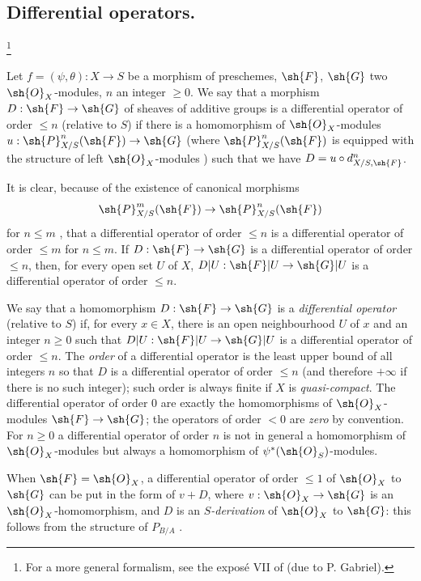 \subsection{Differential operators.}
\footnote{
  For a more general formalism, see the expos\'e VII of \cite{IV-42} (due to P. Gabriel).
}
\label{IV.16.8}

\begin{definition}[16.8.1]
\label{IV.16.8.1}
Let $f = (\psi, \theta): X \to S$ be a morphism of preschemes, $\sh{F}$, $\sh{G}$ two $\sh{O}_X$-modules, $n$ an integer $\geq 0$.
We say that a morphism $D: \sh{F} \to \sh{G}$ of sheaves of additive groups is a differential operator of order $\leq n$ (relative to $S$) if there is a homomorphism of $\sh{O}_X$-modules $u: \sh{P}_{X/S}^n(\sh{F}) \to \sh{G}$ (where $\sh{P}_{X/S}^n(\sh{F})$ is equipped with the structure of left $\sh{O}_X$-modules ) such that we have $D = u \circ d_{X/S, \sh{F}}^n$.
\end{definition}

It is clear, because of the existence of canonical morphisms
\[
  \sh{P}_{X/S}^m(\sh{F}) \to \sh{P}_{X/S}^n(\sh{F})
\] 
for $n \leq m$ , that a differential operator of order $\leq n$ is a differential operator of order $\leq m$ for $n \leq m$.
If $D:\sh{F} \to \sh{G}$ is a differential operator of order $\leq n$, then, for every open set $U$ of $X$, $D|U: \sh{F}|U \to \sh{G}|U$ is a differential operator of order $\leq n$.

We say that a homomorphism $D: \sh{F} \to \sh{G}$ is a \emph{differential operator} (relative to $S$) if, for every $x \in X$, there is an open neighbourhood $U$ of $x$ and an integer $n \geq 0$ such that $D|U: \sh{F}|U \to \sh{G}|U$ is a differential operator of order $\leq n$.
The \emph{order} of a differential operator is the least upper bound of all integers $n$ so that $D$ is a differential operator of order $\leq n$ (and therefore $+\infty$ if there is no such integer);
such order is always finite if $X$ is \emph{quasi-compact}.
The differential operator of order $0$ are exactly the homomorphisms of $\sh{O}_X$-modules $\sh{F} \to \sh{G}$;
the operators of order $<0$ are \emph{zero} by convention.
For $n \geq 0$ a differential operator of order $n$ is not in general a homomorphism of $\sh{O}_X$-modules but always a homomorphism of $\psi^*(\sh{O}_S)$-modules.

When $\sh{F} = \sh{O}_X$, a differential operator of order $\leq 1$ of $\sh{O}_X$ to $\sh{G}$ can be put in the form of $v + D$, where $v: \sh{O}_X \to \sh{G}$ is an $\sh{O}_X$-homomorphism, and $D$ is an \emph{$S$-derivation}  of $\sh{O}_X$ to $\sh{G}$: this follows from the structure of $P_{B/A}$ .

